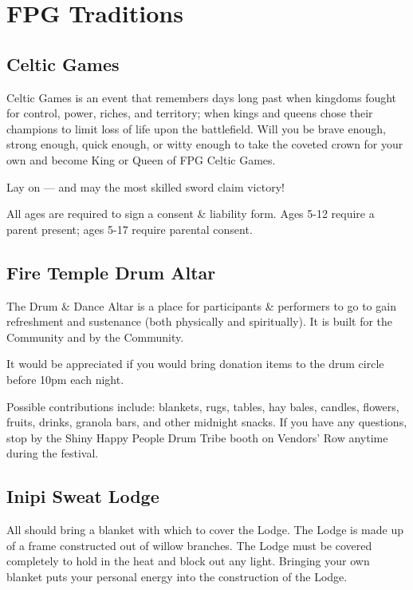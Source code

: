 \documentclass[9pt,twoside,openright,final,article,letterpaper]{memoir}
\let\oldsection=\section
\renewcommand{\section}[1]{%
  \nopagebreak
  \vspace{6pt} %
  \needspace{1.5in}
  \oldsection{#1}
  \nopagebreak}
\let\oldsubsection=\subsection
\renewcommand{\subsection}[1]{%
  \vspace{6pt}
  \needspace{1.25in}
  \oldsubsection{#1}
  \nopagebreak}
\begin{document}
\section{FPG Traditions}
\begin{multicols}{2}

  \subsection{Celtic Games}

  Celtic Games is an event that remembers days long past when kingdoms
  fought for control, power, riches, and territory; when kings and
  queens chose their champions to limit loss of life upon the
  battlefield. Will you be brave enough, strong enough, quick enough,
  or witty enough to take the coveted crown for your own and become
  King or Queen of FPG Celtic Games. 

  Lay on --- and may the most skilled sword claim victory!

  All ages are required to sign a consent \& liability form. Ages 5-12
  require a parent present; ages 5-17 require parental consent.

  \subsection{Fire Temple Drum Altar}

  The Drum \& Dance Altar is a place for participants \& performers to
  go to gain refreshment and sustenance (both physically and
  spiritually). It is built for the Community and by the Community.
  
  It would be appreciated if you would bring donation items to the
  drum circle before 10pm each night.

  Possible contributions include: blankets, rugs, tables, hay bales,
  candles, flowers, fruits, drinks, granola bars, and other midnight
  snacks. If you have any questions, stop by the Shiny Happy People Drum
  Tribe booth on Vendors’ Row anytime during the festival.

  \subsection{Inipi Sweat Lodge} \label{sweatlodge}

  All should bring a blanket with which to cover the Lodge. The Lodge
  is made up of a frame constructed out of willow branches. The Lodge
  must be covered completely to hold in the heat and block out any
  light. Bringing your own blanket puts your personal energy into the
  construction of the Lodge.


\end{multicols}
\end{document}
